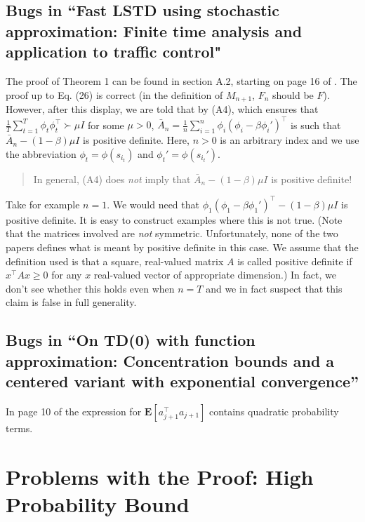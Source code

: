 \documentclass{article}
\begin{document}
\subsection{Bugs in ``Fast LSTD using stochastic approximation: Finite time analysis and application to traffic control"}
The proof of Theorem 1 can be found in section A.2, starting on page 16 of \cite{flstda}.
The proof up to Eq. (26) is correct (in the definition of $M_{n+1}$, $F_n$ should be $F$).
However, after this display, we are told that by (A4), which ensures that $\frac1T \sum_{t=1}^T \phi_t \phi_t^\top \succ \mu I$ for some $\mu>0$, $\bar A_n = \frac1n \sum_{i=1}^n \phi_i (\phi_i - \beta \phi_i')^\top$ is such that $\bar A_n - (1-\beta) \mu I $ is positive definite. 
Here, $n>0$ is an arbitrary index and we use the abbreviation $\phi_t = \phi(s_{i_t})$ and $\phi_t' = \phi(s_{i_t}')$.
\begin{quote}
In general, (A4) does \emph{not} imply that  $\bar A_n - (1-\beta) \mu I $ is positive definite!
\end{quote}
Take for example $n=1$. We would need that $\phi_1 (\phi_1 - \beta \phi_1')^\top - (1-\beta) \mu I$ is positive definite.
It is easy to construct examples where this is not true. (Note that the matrices involved are \emph{not} symmetric. Unfortunately, none of the two papers defines what is meant by positive definite in this case. We assume that the definition used is that a square, real-valued matrix $A$ is called positive definite if $x^\top A x\ge 0$ for any $x$ real-valued vector of appropriate dimension.)
In fact, we don't see whether this holds even when $n=T$ and we in fact suspect that this claim is false in full generality.
\subsection{Bugs in ``On TD(0) with function approximation: Concentration bounds and a centered variant with exponential convergence''}
In page 10 of \cite{lstdicmla} the expression for $\mathbf{E}[a_{j+1}^\top a_{j+1}]$ contains quadratic probability terms. 






\section{Problems with the Proof: High Probability Bound}
\end{document}
